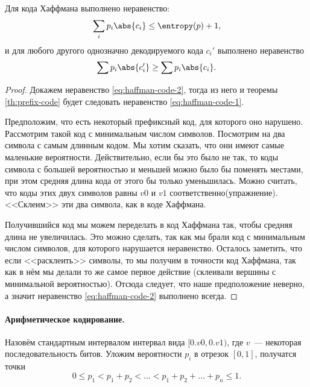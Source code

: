 \begin{theorem}[Хаффман]
    Для кода Хаффмана выполнено неравенство:
    \begin{equation}
        \label{eq:haffman-code-1}
        \sum_i p_i \abs{c_i} \le \entropy(p) + 1,
    \end{equation}
    и для любого другого однозначно декодируемого кода $c_i'$ выполнено неравенство
    \begin{equation}
        \label{eq:haffman-code-2}
        \sum p_i\abs{c_i'} \ge \sum p_i\abs{c_i}.
    \end{equation}
\end{theorem}

\begin{proof}
    Докажем неравенство \eqref{eq:haffman-code-2}, тогда из него и теоремы \ref{th:prefix-code} будет
    следовать неравенство \eqref{eq:haffman-code-1}.

    Предположим, что есть некоторый префиксный код, для которого оно нарушено. Рассмотрим такой код с
    минимальным числом символов. Посмотрим на два символа с самым длинным кодом. Мы хотим сказать, что
    они имеют самые маленькие вероятности. Действительно, если бы это было не так, то коды символа с
    большей вероятностью и меньшей можно было бы поменять местами, при этом средняя длина кода от этого
    бы только уменьшилась. Можно считать, что коды этих двух символов равны $v0$ и $v1$
    соответственно(упражнение). <<Склеим>> эти два символа, как в коде Хаффмана.

    Получившийся код мы можем переделать в код Хаффмана так, чтобы средняя длина не увеличилась. Это
    можно сделать, так как мы брали код с минимальным числом символов, для которого нарушается
    неравенство. Осталось заметить, что если <<расклеить>> символы, то мы получим в точности 
    код Хаффмана, так как в нём мы делали то же самое первое действие (склеивали вершины с минимальной
    вероятностью). Отсюда следует, что наше предположение неверно, а значит неравенство
    \eqref{eq:haffman-code-2} выполнено всегда.
\end{proof}

\paragraph{Арифметическое кодирование.}
Назовём стандартным интервалом интервал вида $[0.v0, 0.v1)$, где $v$~--- некоторая последовательность
битов. Уложим вероятности $p_i$ в отрезок $[0, 1]$, получатся точки
$$
0 \le p_1 <  p_1 + p_2 < \dots < p_1 + p_2 + \dots + p_n \le 1.
$$ 

